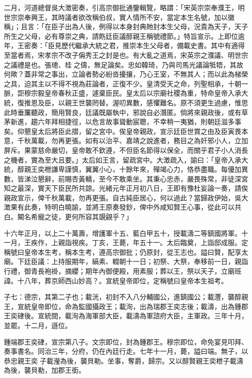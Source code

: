 \begin{pinyinscope}
二月，河道總督吳大澂密奏，引高宗御批通鑒輯覽，略謂：「宋英宗崇奉濮王，明世宗崇奉興王，其時議者欲改稱伯叔，實人情所不安，當定本生名號，加以徽稱」；且言：「在臣子出為人後，例得以本身封典貤封本生父母，況貴為天子，天子所生之父母，必有尊崇之典，請飭廷臣議醇親王稱號禮節。」特旨宣示。上即位逾年，王密奏：「臣見歷代繼承大統之君，推崇本生父母者，備載史書。其中有適得至當者焉，宋孝宗不改子偁秀王之封是也。有大亂之道焉，宋英宗之濮議、明世宗之議禮是也。張璁、桂之儔，無足論矣。忠如韓琦，乃與司馬光議論牴牾，其故何歟？蓋非常之事出，立論者勢必紛沓擾攘，乃心王室，不無其人；而以此為梯榮之具，迫其主以不得不視為莊論者，正復不少。皇清受天之命，列聖相承，十朝一脈，詎穆宗毅皇帝春秋正盛，遽棄臣民。皇太后以宗廟社稷為重，特命皇帝入承大統，復推恩及臣，以親王世襲罔替。渥叨異數，感懼難名。原不須更生過慮，惟思此時垂簾聽政，簡用賢良，廷議既屬執中，邪說自必潛匿。倘將來親政後，或有草茅新進，趨六年拜相捷徑，以危言故事聳動宸聰，不幸稍一夷猶，則朝廷滋多事矣。仰懇皇太后將臣此摺，留之宮中。俟皇帝親政，宣示廷臣世賞之由及臣寅畏本意，千秋萬載，勿再更張。如有以治平、嘉靖之說進者，務目之為奸邪小人，立加屏斥。果蒙慈命嚴切，皇帝敢不欽遵，不但臣名節得以保全，而關乎君子小人消長之機者，實為至大且要。」太后如王言，留疏宮中。大澂疏入，諭曰：「皇帝入承大統，醇親王奕枻謙卑謹慎，翼翼小心，十餘年來，殫竭心力，恪恭盡職。每優加異數，皆涕泣懇辭，前賜杏黃轎，至今不敢乘坐。其秉心忠赤，嚴畏殊常，非徒深宮知之最深，實天下臣民所共諒。光緒元年正月初八日，王即有豫杜妄論一奏，請俟親政宣示，俾千秋萬載，勿再更張。自古純臣居心，何以過此？當歸政伊始，吳大澂果有此奏，特明白曉諭，並將王原奏發鈔，俾中外咸知賢王心事，從此可以共白。闞名希寵之徒，更何所容其覬覦乎？」

十六年正月，以上二十萬壽，增護軍十五、藍白甲五十，授載濤二等鎮國將軍。十一月，王疾作，上親詣視疾。丁亥，王薨，年五十一。太后臨奠，上詣邸成服。定稱號曰皇帝本生考，稱本生考，遵高宗御批；仍原封，從王志也。謚曰賢，配享太廟。下廷臣議：上持服期年，縞素、輟朝十一日；初祭、大祭，奉移前一日，親詣行禮，御青長袍褂，摘纓；期年內御便殿，用素服；葬以王，祭以天子，立廟班諱。十八年，葬京師西山妙高？。宣統皇帝即位，定稱號曰皇帝本生祖考。

子七：德宗，其第二子也；載洸，初封不入八分輔國公，進鎮國公；載灃，襲醇親王，宣統皇帝即位，命為監國攝政王；載洵，出為瑞郡王奕志後；載濤，出為鍾郡王奕硉後。宣統間，載洵為海軍部大臣，載濤為軍諮府大臣，主軍政。三年十月，並罷。十二月，遜位。

鍾端郡王奕硉，宣宗第八子。文宗即位，封為鍾郡王。穆宗即位，命免宴見叩拜、奏事書名。同治三年，分府，仍在內廷行走。七年十一月，薨，謚曰端。無子，以恭忠親王奕子載瀅為後，襲貝勒。坐事，奪爵，歸宗。又以醇賢親王奕枻子載濤為後，襲貝勒，加郡王銜。


\end{pinyinscope}
